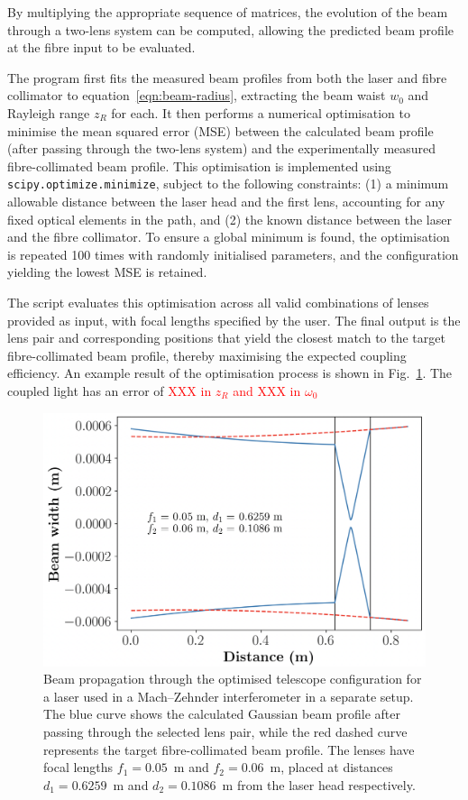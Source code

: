 By multiplying the appropriate sequence of matrices, the evolution of the beam through a two-lens system can be computed, allowing the predicted beam profile at the fibre input to be evaluated.

The program first fits the measured beam profiles from both the laser and fibre collimator to equation~\ref{eqn:beam-radius}, extracting the beam waist $w_0$ and Rayleigh range $z_R$ for each. It then performs a numerical optimisation to minimise the mean squared error (MSE) between the calculated beam profile (after passing through the two-lens system) and the experimentally measured fibre-collimated beam profile. This optimisation is implemented using \texttt{scipy.optimize.minimize}, subject to the following constraints: (1) a minimum allowable distance between the laser head and the first lens, accounting for any fixed optical elements in the path, and (2) the known distance between the laser and the fibre collimator. To ensure a global minimum is found, the optimisation is repeated 100 times with randomly initialised parameters, and the configuration yielding the lowest MSE is retained.

The script evaluates this optimisation across all valid combinations of lenses provided as input, with focal lengths specified by the user. The final output is the lens pair and corresponding positions that yield the closest match to the target fibre-collimated beam profile, thereby maximising the expected coupling efficiency. An example result of the optimisation process is shown in Fig.~\ref{fig:optimised-telescope}. The coupled light has an error of \textcolor{red}{XXX in $z_R$ and XXX in $\omega_0$}

\begin{figure}[h]
    \centering
    \includegraphics[width=0.9\linewidth]{Figures/OptimalTelescope.png}
    \caption{Beam propagation through the optimised telescope configuration for a laser used in a Mach–Zehnder interferometer in a separate setup. The blue curve shows the calculated Gaussian beam profile after passing through the selected lens pair, while the red dashed curve represents the target fibre-collimated beam profile. The lenses have focal lengths $f_1 = 0.05$~m and $f_2 = 0.06$~m, placed at distances $d_1 = 0.6259$~m and $d_2 = 0.1086$~m from the laser head respectively.}
    \label{fig:optimised-telescope}
\end{figure}


